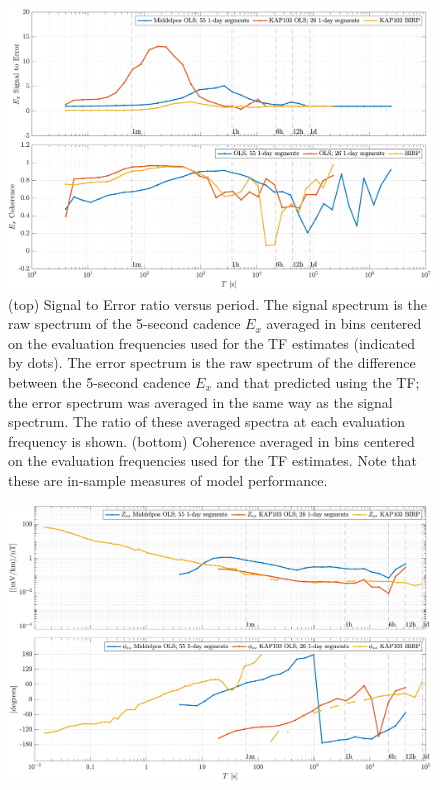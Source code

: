 \documentclass{article}
\begin{document}
\begin{figure}[h!]
\centering
\includegraphics[width=\textwidth]{figures/KAP103_Middelpos/SN_compare-E_x.pdf}
\caption{(top) Signal to Error ratio versus period. The signal spectrum is the raw spectrum of the 5-second cadence $E_x$ averaged in bins centered on the evaluation frequencies used for the TF estimates (indicated by dots). The error spectrum is the raw spectrum of the difference between the 5-second cadence $E_x$ and that predicted using the TF; the error spectrum was averaged in the same way as the signal spectrum. The ratio of these averaged spectra at each evaluation frequency is shown. (bottom) Coherence averaged in bins centered on the evaluation frequencies used for the TF estimates. Note that these are in-sample measures of model performance.}
\label{fig:universe}
\end{figure}

\clearpage

\begin{figure}[h!]
\centering
\includegraphics[width=\textwidth]{figures/KAP103_Middelpos/transferfnZ_compare-Z_xx_Magnitude_Phase.pdf}
\caption{}
\end{figure}
\end{document}
